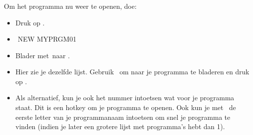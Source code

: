 \begin{frame}
\frametitle{ \tiPRGM}


Om het programma nu weer te openen, doe:
\begin{itemize}
  \item Druk op \tiPRGM.
  \pause %
  \item {}
	  \begin{ticalc}[3.25cm]
	  	\,\,NEW
	  	MYPRGM01
	  \end{ticalc}
  \pause %
  \item Blader met \tiRight\,naar .
  \pause %
  \item Hier zie je dezelfde lijst. Gebruik \tiDown\, om naar je programma te bladeren en druk op \tiENTER.
  \pause %
  \item Als alternatief, kun je ook het nummer intoetsen wat voor je programma staat. Dit is een hotkey om je programma te openen.
  \pause %
  		Ook kun je met \tiALPHA\, de eerste letter van je programmanaam intoetsen om snel je programma te vinden
  		(indien je later een grotere lijst met programma's hebt dan 1).
\end{itemize}
\end{frame}




